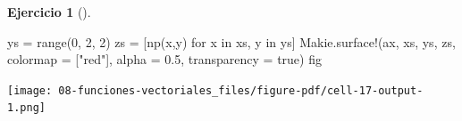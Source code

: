 \documentclass[
  a4paper,
]{scrreport}
\newenvironment{Shaded}{\begin{snugshade}}{\end{snugshade}}
\newcommand{\ConstantTok}[1]{\textcolor[rgb]{0.56,0.35,0.01}{#1}}
\newcommand{\FloatTok}[1]{\textcolor[rgb]{0.68,0.00,0.00}{#1}}
\newcommand{\FunctionTok}[1]{\textcolor[rgb]{0.28,0.35,0.67}{#1}}
\newcommand{\KeywordTok}[1]{\textcolor[rgb]{0.00,0.23,0.31}{#1}}
\newcommand{\NormalTok}[1]{\textcolor[rgb]{0.00,0.23,0.31}{#1}}
\newcommand{\OperatorTok}[1]{\textcolor[rgb]{0.37,0.37,0.37}{#1}}
\newcommand{\StringTok}[1]{\textcolor[rgb]{0.13,0.47,0.30}{#1}}
\theoremstyle{definition}
\newtheorem{exercise}{Ejercicio}[chapter]
\theoremstyle{remark}
\begin{document}
\begin{exercise}[]
\begin{enumerate}
\begin{tcolorbox}
\begin{Shaded}
\begin{Highlighting}[]
\NormalTok{ys }\OperatorTok{=} \FunctionTok{range}\NormalTok{(}\FloatTok{0}\NormalTok{, }\FloatTok{2}\NormalTok{, }\FloatTok{2}\NormalTok{)}
\NormalTok{zs }\OperatorTok{=}\NormalTok{ [}\FunctionTok{np}\NormalTok{(x,y) for x }\KeywordTok{in}\NormalTok{ xs, y }\KeywordTok{in}\NormalTok{ ys]}
\NormalTok{Makie.}\FunctionTok{surface!}\NormalTok{(ax, xs, ys, zs, colormap }\OperatorTok{=}\NormalTok{ [}\StringTok{"red"}\NormalTok{], alpha }\OperatorTok{=} \FloatTok{0.5}\NormalTok{, transparency }\OperatorTok{=} \ConstantTok{true}\NormalTok{)}
\NormalTok{fig}
\end{Highlighting}
\end{Shaded}

  \texttt{[image: 08-funciones-vectoriales\_files/figure-pdf/cell-17-output-1.png]}

  \end{tcolorbox}
\end{enumerate}

\end{exercise}
\end{document}
